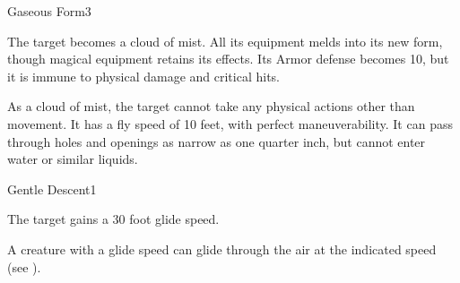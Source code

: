 \begin{spellsection}{Gaseous Form}{3}
    \begin{spellheader}
    \end{spellheader}
    \begin{spellcontent}
        \begin{spelltargetinginfo}
        \end{spelltargetinginfo}
        \begin{spelleffects}
            \spelleffect The target becomes a cloud of mist. All its equipment melds into its new form, though magical equipment retains its effects. Its Armor defense becomes 10, but it is immune to physical damage and critical hits.

            As a cloud of mist, the target cannot take any physical actions other than movement. It has a fly speed of 10 feet, with perfect maneuverability. It can pass through holes and openings as narrow as one quarter inch, but cannot enter water or similar liquids.
            \spelldur \durshort \dismissable
        \end{spelleffects}
    \end{spellcontent}
    \begin{spellfooter}
        \miscastexplode
    \end{spellfooter}
\end{spellsection}

\begin{spellsection}{Gentle Descent}{1}
    \begin{spellheader}
    \end{spellheader}
    \begin{spellcontent}
        \begin{spelltargetinginfo}
        \end{spelltargetinginfo}
        \begin{spelleffects}
            \spelleffect The target gains a 30 foot glide speed.
            \spelldur \durshort
        \end{spelleffects}
    \end{spellcontent}
    \begin{spellfooter}
        \spellnotes A creature with a glide speed can glide through the air at the indicated speed (see ).
        \miscastrandom
    \end{spellfooter}
\end{spellsection}

